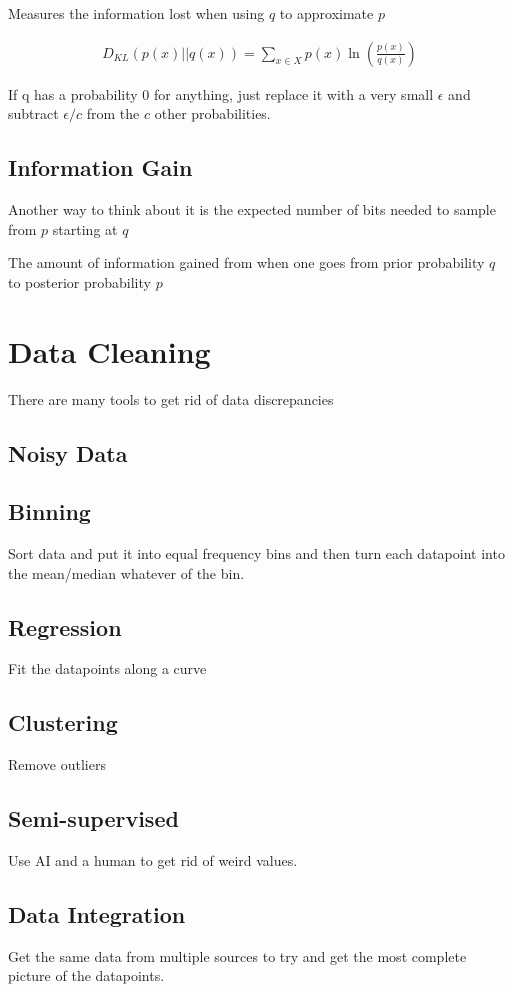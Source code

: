 \documentclass[fleqn]{report}
\newcommand{\equations} [1] {
\begin{gather*}
#1
\end{gather*}
}
\begin{document}
Measures the information lost when using $q$ to approximate $p$ 

\equations{
    D_{KL}(p(x) || q(x))
    =
    \sum_{x \in X}
    p(x) \ln(\frac{p(x)}{q(x)})
}

If q has a probability 0 for anything, just replace it with a very small $\epsilon$
and subtract $\epsilon / c$ from the $c$ other probabilities.

\subsection{Information Gain}
Another way to think about it is the expected number of bits needed 
to sample from $p$ starting at $q$ 

The amount of information gained from when one goes from prior probability $q$ 
to posterior probability $p$ 

\section{Data Cleaning}
There are many tools to get rid of data discrepancies


\subsection{Noisy Data}
\subsection{Binning}
Sort data and put it into equal frequency bins and then turn each datapoint 
into the mean/median whatever of the bin. 

\subsection{Regression}
Fit the datapoints along a curve 

\subsection{Clustering }
Remove outliers 

\subsection{Semi-supervised}
Use AI and a human to get rid of weird values.

\subsection{Data Integration}
Get the same data from multiple sources to try and get the most 
complete picture of the datapoints.
\end{document}
